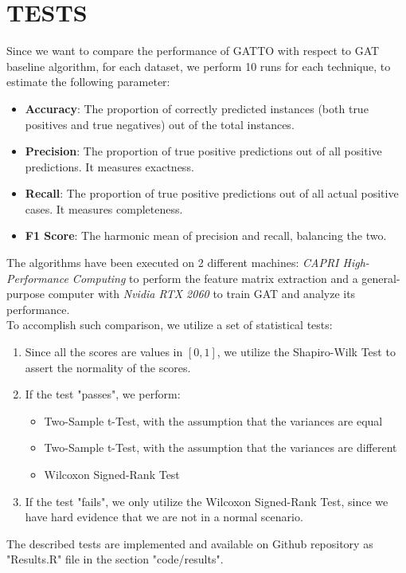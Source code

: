 \documentclass[12pt,conference]{ieeeconf} %
\begin{document}
\section{TESTS} 
Since we want to compare the performance of GATTO with respect to GAT baseline algorithm, for each dataset, we perform 10 runs for each technique, to estimate the following parameter:
\begin{itemize}
    \item \textbf{Accuracy}: The proportion of correctly predicted instances (both true positives and true negatives) out of the total instances.
    \item \textbf{Precision}: The proportion of true positive predictions out of all positive predictions. It measures exactness.
    \item \textbf{Recall}: The proportion of true positive predictions out of all actual positive cases. It measures completeness.
    \item \textbf{F1 Score}: The harmonic mean of precision and recall, balancing the two.
\end{itemize}
The algorithms have been executed on 2 different machines: \textit{CAPRI High-Performance Computing} to perform the feature matrix extraction and a general-purpose computer with \textit{Nvidia RTX 2060} to train GAT and analyze its performance.\\
To accomplish such comparison, we utilize a set of statistical tests:
\begin{enumerate}
    \item Since all the scores are values in $[0,1]$, we utilize the Shapiro-Wilk Test to assert the normality of the scores.
    \item If the test "passes", we perform:
        \begin{itemize}
            \item Two-Sample t-Test, with the assumption that the variances are equal
            \item Two-Sample t-Test, with the assumption that the variances are different
            \item Wilcoxon Signed-Rank Test
        \end{itemize}
    \item If the test "fails", we only utilize the Wilcoxon Signed-Rank Test, since we have hard evidence that we are not in a normal scenario. 
\end{enumerate}
The described tests are implemented and available on Github repository as "Results.R" file in the section "code/results".\\
\end{document}

